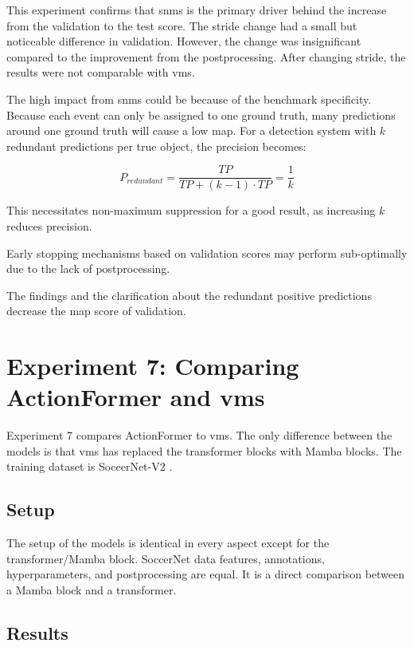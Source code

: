 This experiment confirms that \acrshort{snms} is the primary driver behind the increase from the validation to the test score. The stride change had a small but noticeable difference in validation. However, the change was insignificant compared to the improvement from the postprocessing. After changing stride, the results were not comparable with \acrshort{vms}. 

The high impact from \acrshort{snms} could be because of the benchmark specificity. Because each event can only be assigned to one ground truth, many predictions around one ground truth will cause a low \acrlong{map}. For a detection system with $k$ redundant predictions per true object, the precision becomes:

\[P_{redundant} = \frac{TP}{TP + (k-1) \cdot TP} = \frac{1}{k}\]

This necessitates non-maximum suppression for a good result, as increasing $k$ reduces precision. 


Early stopping mechanisms based on validation scores may perform sub-optimally due to the lack of postprocessing. 

The findings and the clarification about the redundant positive predictions decrease the \acrshort{map} score of validation.

\section{Experiment 7: Comparing ActionFormer and \acrlong{vms}}
\label{sec:experiment_7}

Experiment 7 compares ActionFormer to \acrshort{vms}. The only difference between the models is that \acrshort{vms} has replaced the transformer blocks with Mamba blocks. The training dataset is SoccerNet-V2 \cite{deliege_soccernet-v2_dataset_2021}.

\subsection{Setup}

The setup of the models is identical in every aspect except for the transformer/Mamba block. SoccerNet data features, annotations, hyperparameters, and postprocessing are equal. It is a direct comparison between a Mamba block and a transformer.

\subsection{Results}

